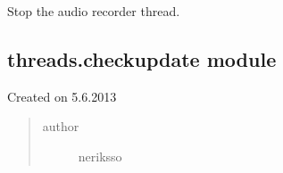 \documentclass[letterpaper,10pt,english]{sphinxmanual}
\begin{document}
\begin{fulllineitems}
\begin{fulllineitems}
\end{fulllineitems}


\begin{fulllineitems}
\label{threads:threads.audiorecorder.AudioRecorder.stop}
Stop the audio recorder thread.

\end{fulllineitems}


\end{fulllineitems}



\subsection{threads.checkupdate module}
\label{threads:threads-checkupdate-module}\label{threads:module-threads.checkupdate}
Created on 5.6.2013
\begin{quote}\begin{description}
\item[{author}] \leavevmode
neriksso

\end{description}\end{quote}
\end{document}
